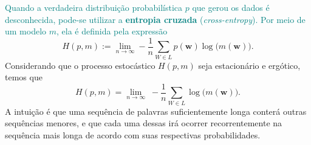 \documentclass{automatextcc}
\newcommand{\nico}[1]{\textcolor{teal}{#1}}
\newcommand{\N}{\mathds{N}}
\newcommand{\bs}[1]{\boldsymbol{#1}}
\begin{document}

\nico{Quando a verdadeira distribuição probabilística $p$ que gerou os dados é desconhecida, pode-se utilizar a \textbf{entropia cruzada} (\textit{cross-entropy}). Por meio de um modelo $m$, ela é definida pela expressão}
\begin{equation*}
    H(p,m) := \lim_{n \rightarrow \infty}  - \frac{1}{n} \sum_{W \in L}  p(\bs{w}) \log\big(m(\bs{w})\big) .
\end{equation*}
Considerando que o processo estocástico $H(p,m)$ seja estacionário e ergótico, temos que
\begin{equation*}
    H(p,m) = \lim_{n \rightarrow \infty} \; - \frac{1}{n} \sum_{W \in L} \log\big(m(\bs{w})\big).
\end{equation*}
A intuição é que uma sequência de palavras suficientemente longa conterá outras sequências menores, e que cada uma dessas irá ocorrer recorrentemente na sequência mais longa de acordo com suas respectivas probabilidades.
\end{document}
